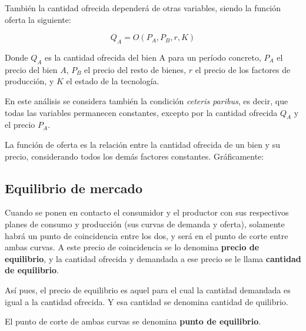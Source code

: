 También la cantidad ofrecida dependerá de otras variables,
siendo la función oferta la siguiente:

\begin{equation*}
    Q_A = O(P_A, P_B, r, K)
\end{equation*}

Donde \(Q_A\) es la cantidad ofrecida del bien A para un período concreto,
\(P_A\) el precio del bien \(A\),
\(P_B\) el precio del resto de bienes,
\(r\) el precio de los factores de producción,
y \(K\) el estado de la tecnología.

En este análisis se considera también la condición \textit{ceteris paribus},
es decir, que todas las variables permanecen constantes,
excepto por la cantidad ofrecida \(Q_A\) y el precio \(P_A\).

La función de oferta es la relación entre la cantidad ofrecida de un bien y su precio,
considerando todos los demás factores constantes. Gráficamente:

\begin{center}
\end{center}

\subsection{Equilibrio de mercado}

Cuando se ponen en contacto el consumidor y el productor 
con sus respectivos planes de consumo y producción
(sus curvas de demanda y oferta),
solamente habrá un punto de coincidencia entre los dos,
y será en el punto de corte entre ambas curvas.
A este precio de coincidencia se lo denomina \textbf{precio de equilibrio},
y la cantidad ofrecida y demandada a ese precio se le llama \textbf{cantidad de equilibrio}.

Así pues,
el precio de equilibrio es aquel para el cual la cantidad demandada es igual a la cantidad ofrecida.
Y esa cantidad se denomina cantidad de quilibrio.

El punto de corte de ambas curvas se denomina \textbf{punto de equilibrio}.

